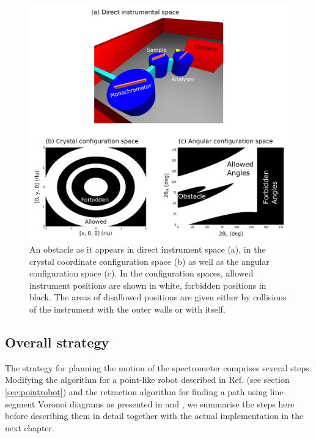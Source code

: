 \begin{figure}[htb]
	\centering
	\includegraphics[width = 0.95 \textwidth]{figures/tas_wall.jpg}
	\caption[TAS configuration spaces.]{
		An obstacle as it appears in direct instrument space (a), in the 
		crystal coordinate configuration space (b) as well as the angular
		configuration space (c).
		In the configuration spaces, allowed instrument positions are 
		shown in white, forbidden positions in black. 
		The areas of disallowed positions are given either by collisions 
		of the instrument with the outer walls or with itself.}
	\label{fig:tas_wall}
\end{figure}


\subsection{Overall strategy}
\label{sec:strategy}

The strategy for planning the motion of the spectrometer comprises several steps. 
Modifying the algorithm for a point-like robot described in Ref. 
\cite[Ch. 13, pp. 283-306]{Berg2008} (see section \ref{sec:pointrobot}) and the 
retraction algorithm for finding a path using line-segment Voronoi diagrams as 
presented in \cite[p. 163]{Berg2008} and \cite[pp. 247-251]{FUH_geo2020}, we 
summarise the steps here before describing them in detail together with the actual
implementation in the next chapter.

